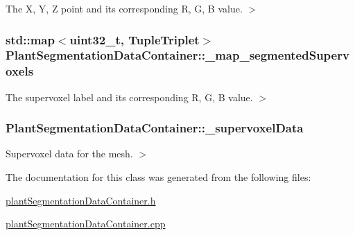The X, Y, Z point and its corresponding R, G, B value. $>$ 

\hypertarget{classPlantSegmentationDataContainer_a593599986e0a17d7e94df9e7bbae9db2}{
\subsubsection[{\-\_\-map\-\_\-segmented\-Supervoxels}]{\setlength{\rightskip}{0pt plus 5cm}std\-::map$<$uint32\-\_\-t, {\bf Tuple\-Triplet}$>$ Plant\-Segmentation\-Data\-Container\-::\-\_\-map\-\_\-segmented\-Supervoxels}}\label{classPlantSegmentationDataContainer_a593599986e0a17d7e94df9e7bbae9db2}


The supervoxel label and its corresponding R, G, B value. $>$ 

\hypertarget{classPlantSegmentationDataContainer_a83b40592cb99a418ea689481425fc894}{
\subsubsection[{\-\_\-supervoxel\-Data}]{ Plant\-Segmentation\-Data\-Container\-::\-\_\-supervoxel\-Data}}\label{classPlantSegmentationDataContainer_a83b40592cb99a418ea689481425fc894}


Supervoxel data for the mesh. $>$ 



The documentation for this class was generated from the following files\-:\begin{DoxyCompactItemize}
\item 
\hyperlink{plantSegmentationDataContainer_8h}{plant\-Segmentation\-Data\-Container.\-h}\item 
\hyperlink{plantSegmentationDataContainer_8cpp}{plant\-Segmentation\-Data\-Container.\-cpp}\end{DoxyCompactItemize}
